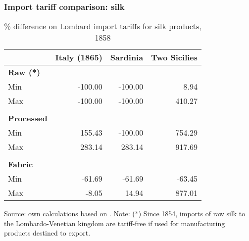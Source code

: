 \documentclass[10pt]{beamer}
\begin{document}
\begin{frame}
    \frametitle{Import tariff comparison: silk}

\begin{table}[!h]
\caption{\% difference on Lombard import tariffs for silk products, 1858}
\centering
\fontsize{8}{8}\selectfont

    \begin{tabular}{l r r r}  
        \toprule
         & Italy (1865) & Sardinia & Two Sicilies \\ 
        \midrule
        \textbf{Raw (*)} \\
        Min & -100.00 & -100.00 & 8.94 \\
        Max & -100.00 & -100.00 & 410.27 \\
        \\
        \textbf{Processed} \\
        Min & 155.43 & -100.00 & 754.29 \\
        Max & 283.14 & 283.14 & 917.69 \\
        \\
        \textbf{Fabric} \\
        Min & -61.69 & -61.69 & -63.45 \\
        Max & -8.05 & 14.94 & 877.01 \\
        \bottomrule    
    \end{tabular}
    
    Source: own calculations based on \cite[][pp. 132 ff.]{cappellari1866}. Note: (*) Since 1854, imports of raw silk to the Lombardo-Venetian kingdom are tariff-free if used for manufacturing products destined to export. 

\end{table}
   
\hyperlink{trade_comparison}{}

   
\end{frame}
\end{document}
